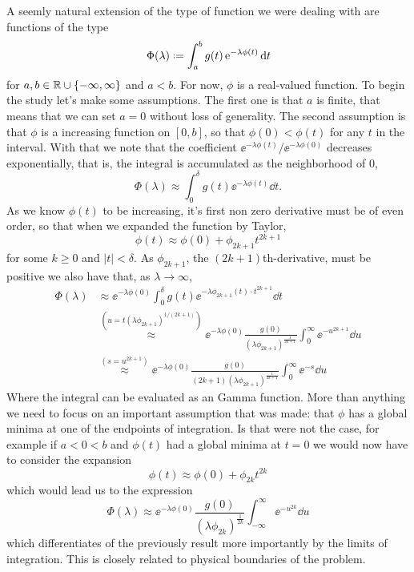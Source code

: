 A seemly natural extension of the type of function we were dealing with are functions of the type
\begin{equation}
	\Phi(\lambda) \deff \int_{a}^{b} g(t) \ee^{-\lambda \phi(t)} \dd t
	\label{equation: Laplace}
\end{equation}
for $a,b \in \mathbb{R} \cup \{-\infty, \infty\}$ and $a<b$. For now, $\phi$ is a real-valued function. To begin the study let's make some assumptions. The first one is that $a$ is finite, that means that we can set $a=0$ without loss of generality. The second assumption is that $\phi$ is a increasing function on $[0,b]$, so that $\phi(0) < \phi(t)$ for any $t$ in the interval. With that we note that the coefficient $\ee^{-\lambda \phi(t)} / \ee^{-\lambda \phi(0)}$ decreases exponentially, that is, the integral is accumulated as the neighborhood of $0$,
$$\Phi(\lambda) \approx \int_{0}^{\delta} g(t) \ee^{-\lambda \phi(t)} \dd t.$$
As we know $\phi(t)$ to be increasing, it's first non zero derivative must be of even order, so that when we expanded the function by Taylor, 
$$\phi(t) \approx \phi(0) + \phi_{2k+1} t^{2k+1}$$
for some $k\geq 0$ and $|t| < \delta$. As $\phi_{2k+1}$, the $(2k+1)$th-derivative, must be positive we also have that, as $\lambda \rightarrow \infty$,
\begin{equation*}
	\begin{split}
		\Phi(\lambda) & \approx \ee^{-\lambda \phi(0)} \int_{0}^{\delta} g(t) \ee^{-\lambda \phi_{2k+1}(t) \cdot t^{2k+1}} \dd t\\
		& \stackrel{(u=t(\lambda \phi_{2k+1})^{1/(2k+1)})}{\approx} \ee^{-\lambda \phi(0)} \frac{g(0)}{(\lambda \phi_{2k+1})^{\frac{1}{2k+1}}} \int_{0}^{\infty} \ee^{-u^{2k+1}} \dd u \\
		& \stackrel{(s=u^{2k+1})}{\approx} \ee^{-\lambda \phi(0)} \frac{g(0)}{ (2k+1)(\lambda \phi_{2k+1})^{\frac{1}{2k+1}}} \int_{0}^{\infty} \ee^{-s} \dd u
	\end{split}
\end{equation*}
Where the integral can be evaluated as an Gamma function. More than anything we need to focus on an important assumption that was made: that $\phi$ has a global minima at one of the endpoints of integration. Is that were not the case, for example if $a < 0 < b$ and $\phi(t)$ had a global minima at $t=0$ we would now have to consider the expansion
$$\phi(t) \approx \phi(0) + \phi_{2k} t^{2k}$$
which would lead us to the expression
$$\Phi(\lambda) \approx \ee^{-\lambda \phi(0)} \frac{g(0)}{(\lambda \phi_{2k})^{\frac{1}{2k}}} \int_{-\infty}^{\infty} \ee^{-u^{2k}} \dd u$$
which differentiates of the previously result more importantly by the limits of integration. This is closely related to physical boundaries of the problem.

